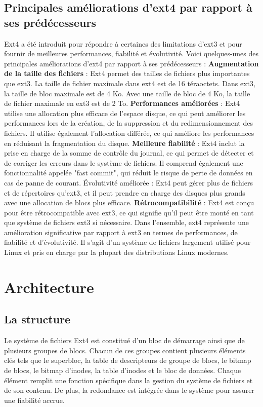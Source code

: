 \documentclass[12pt, letterpaper]{report}
\begin{document}
\section{Principales améliorations d'ext4 par rapport à ses prédécesseurs}
\justifying
Ext4 a été introduit pour répondre à certaines des limitations d'ext3 et pour fournir de meilleures performances, fiabilité et évolutivité. Voici quelques-unes des principales améliorations d'ext4 par rapport à ses prédécesseurs :
\newline
\textbf {Augmentation de la taille des fichiers} : Ext4 permet des tailles de fichiers plus importantes que ext3. La taille de fichier maximale dans ext4 est de 16 téraoctets. Dans ext3, la taille de bloc maximale est de 4 Ko. Avec une taille de bloc de 4 Ko, la taille de fichier maximale en ext3 est de 2 To. 
\newline
\textbf {Performances améliorées} : Ext4 utilise une allocation plus efficace de l'espace disque, ce qui peut améliorer les performances lors de la création, de la suppression et du redimensionnement des fichiers. Il utilise également l'allocation différée, ce qui améliore les performances en réduisant la fragmentation du disque.
\newline
\textbf {Meilleure fiabilité} : Ext4 inclut la prise en charge de la somme de contrôle du journal, ce qui permet de détecter et de corriger les erreurs dans le système de fichiers. Il comprend également une fonctionnalité appelée "fast commit", qui réduit le risque de perte de données en cas de panne de courant.
Évolutivité améliorée : Ext4 peut gérer plus de fichiers et de répertoires qu'ext3, et il peut prendre en charge des disques plus grands avec une allocation de blocs plus efficace.
\newline
\textbf {Rétrocompatibilité} : Ext4 est conçu pour être rétrocompatible avec ext3, ce qui signifie qu'il peut être monté en tant que système de fichiers ext3 si nécessaire.
Dans l'ensemble, ext4 représente une amélioration significative par rapport à ext3 en termes de performances, de fiabilité et d'évolutivité. Il s'agit d'un système de fichiers largement utilisé pour Linux et pris en charge par la plupart des distributions Linux modernes.

\chapter{Architecture}
\section{La structure }
\justifying Le système de fichiers Ext4 est constitué d'un bloc de démarrage ainsi que de plusieurs groupes de blocs. Chacun de ces groupes contient plusieurs éléments clés tels que le superbloc, la table de descripteurs de groupe de blocs, le bitmap de blocs, le bitmap d'inodes, la table d'inodes et le bloc de données. Chaque élément remplit une fonction spécifique dans la gestion du système de fichiers et de son contenu. De plus, la redondance est intégrée dans le système pour assurer une fiabilité accrue.
\end{document}
